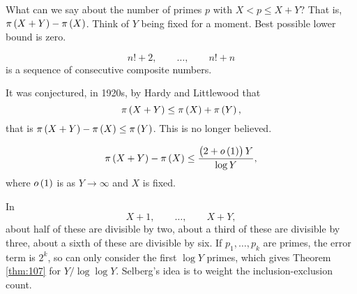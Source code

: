 
What can we say about the number of primes $ p $ with $ X < p \le X + Y $? That is, $ \pi\br{X + Y} - \pi\br{X} $. Think of $ Y $ being fixed for a moment. Best possible lower bound is zero.

\begin{example*}
$$ n! + 2, \qquad \dots, \qquad n! + n $$
is a sequence of consecutive composite numbers.
\end{example*}

It was conjectured, in 1920s, by Hardy and Littlewood that
$$ \pi\br{X + Y} \le \pi\br{X} + \pi\br{Y}, $$
that is $ \pi\br{X + Y} - \pi\br{X} \le \pi\br{Y} $. This is no longer believed.

\begin{theorem}
\label{thm:107}
$$ \pi\br{X + Y} - \pi\br{X} \le \dfrac{\br{2 + o\br{1}}Y}{\log Y}, $$
where $ o\br{1} $ is as $ Y \to \infty $ and $ X $ is fixed.
\end{theorem}

In
$$ X + 1, \qquad \dots, \qquad X + Y, $$
about half of these are divisible by two, about a third of these are divisible by three, about a sixth of these are divisible by six. If $ p_1, \dots, p_k $ are primes, the error term is $ 2^k $, so can only consider the first $ \log Y $ primes, which gives Theorem \ref{thm:107} for $ Y / \log \log Y $. Selberg's idea is to weight the inclusion-exclusion count.

